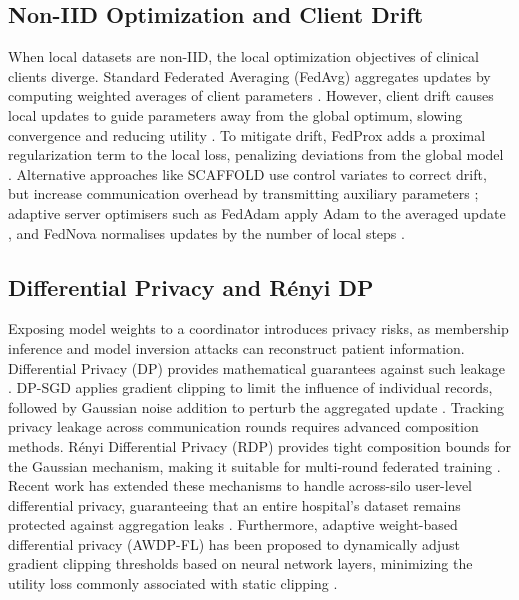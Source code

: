 \documentclass[journal]{IEEEtran}
\begin{document}
\subsection{Non-IID Optimization and Client Drift}
When local datasets are non-IID, the local optimization objectives of clinical clients diverge. Standard Federated Averaging (FedAvg) aggregates updates by computing weighted averages of client parameters \cite{McMahan2017FedAvg}. However, client drift causes local updates to guide parameters away from the global optimum, slowing convergence and reducing utility \cite{Zhao2018NonIID, Wang2021FieldGuide}. To mitigate drift, FedProx adds a proximal regularization term to the local loss, penalizing deviations from the global model \cite{Li2020FedProx}. Alternative approaches like SCAFFOLD use control variates to correct drift, but increase communication overhead by transmitting auxiliary parameters \cite{Karimireddy2020Scaffold}; adaptive server optimisers such as FedAdam apply Adam to the averaged update \cite{Reddi2021FedOpt}, and FedNova normalises updates by the number of local steps \cite{Wang2020FedNova}.

\subsection{Differential Privacy and Rényi DP}
Exposing model weights to a coordinator introduces privacy risks, as membership inference and model inversion attacks can reconstruct patient information. Differential Privacy (DP) provides mathematical guarantees against such leakage \cite{Dwork2008DPSurvey, Dwork2006CalibratingNoise}. DP-SGD applies gradient clipping to limit the influence of individual records, followed by Gaussian noise addition to perturb the aggregated update \cite{Abadi2016DPSGD}. Tracking privacy leakage across communication rounds requires advanced composition methods. Rényi Differential Privacy (RDP) provides tight composition bounds for the Gaussian mechanism, making it suitable for multi-round federated training \cite{Mironov2017RDP, Mironov2019SampledGaussian}. Recent work has extended these mechanisms to handle across-silo user-level differential privacy, guaranteeing that an entire hospital's dataset remains protected against aggregation leaks \cite{Kato2024ULDP}. Furthermore, adaptive weight-based differential privacy (AWDP-FL) has been proposed to dynamically adjust gradient clipping thresholds based on neural network layers, minimizing the utility loss commonly associated with static clipping \cite{Chen2024AWDP}.
\end{document}
